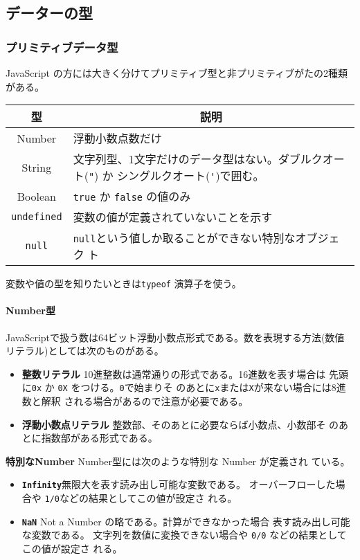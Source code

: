\documentclass[a4j]{jarticle}
\begin{document}
\subsection{データーの型}
\subsubsection{プリミティブデータ型}
JavaScript の方には大きく分けてプリミティブ型と非プリミティブがたの2種類
がある。
\begin{center}
\begin{tabular}{|c|m{}|}\hline
 型&\multicolumn{1}{c|}{説明} \\\hline
 Number & 浮動小数点数だけ\\ \hline
 String & 文字列型、1文字だけのデータ型はない。ダブルクオート(\verb+"+)
     か%
     シングルクオート(\verb+'+)で囲む。\\ \hline
 Boolean& \verb+true+ か \verb+false+ の値のみ\\ \hline
 \verb+undefined+ & 変数の値が定義されていないことを示す\\ \hline
 \verb+null+& \verb+null+という値しか取ることができない特別なオブジェク
     ト\\ \hline
\end{tabular}
\end{center}
変数や値の型を知りたいときは\verb+typeof+ 演算子を使う。
\paragraph{Number型}
JavaScriptで扱う数は64ビット浮動小数点形式である。数を表現する方法(数値
リテラル)としては次のものがある。
\begin{itemize}
 \item{\bfseries 整数リテラル} 10進整数は通常通りの形式である。16進数を表す場合は
	      先頭に\verb+0x+ か \verb+0X+ をつける。\verb+0+で始まりそ
	      のあとに\verb+x+または\verb+X+が来ない場合には8進数と解釈
	      される場合があるので注意が必要である。
 \item{\bfseries 浮動小数点リテラル} 整数部、そのあとに必要ならば小数点、小数部そ
       のあとに指数部がある形式である。
\end{itemize}
{\bfseries 特別なNumber} Number型には次のような特別な Number が定義され
ている。
\begin{itemize}
 \item {\bfseries \verb+Infinity+}無限大を表す読み出し可能な変数である。
       オーバーフローした場合や \verb+1/0+などの結果としてこの値が設定さ
       れる。
 \item {\bfseries \verb+NaN+} Not a Number の略である。計算ができなかった場合
       表す読み出し可能な変数である。
       文字列を数値に変換できない場合や \verb+0/0+ などの結果としてこの値が設定さ
       れる。
\end{itemize}
\end{document}
